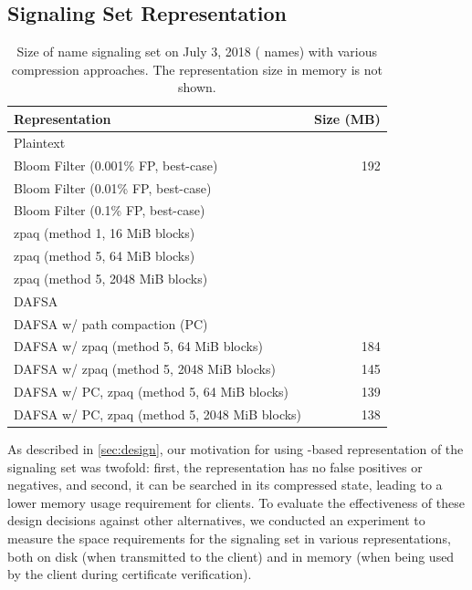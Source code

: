 \subsection{Signaling Set Representation}
\label{sec:evaluation:implementation}



\begin{table}[tb]
  \centering
  \caption{Size of \ac{name} signaling set on
    July 3, 2018 (\numnames{} names) with various compression approaches. The
    representation size in memory is not shown.}
  \begin{tabularx}{\linewidth}{|Xr|}
    \toprule
    \textbf{Representation} & \textbf{Size (MB)} \\
    \midrule
    Plaintext & \plaintextsize \\
    \midrule
    Bloom Filter (0.001\% FP, best-case) & 192 \\
    Bloom Filter (0.01\% FP, best-case) & \bloomlargesize \\
    Bloom Filter (0.1\% FP, best-case) & \bloommedsize \\
    \midrule
    zpaq (method 1, 16 MiB blocks) & \zpaqlargesize \\
    zpaq (method 5, 64 MiB blocks) & \zpaqmedsize \\
    zpaq (method 5, 2048 MiB blocks) & \zpaqsmallsize \\
    \midrule
    DAFSA & \fsalargesize \\
    DAFSA w/ path compaction (PC) & \fsamedsize \\
    DAFSA w/ zpaq (method 5, 64 MiB blocks) & 184 \\
    DAFSA w/ zpaq (method 5, 2048 MiB blocks) & 145 \\
    DAFSA w/ PC, zpaq (method 5, 64 MiB blocks) & 139 \\
    DAFSA w/ PC, zpaq (method 5, 2048 MiB blocks) & 138 \\
    \bottomrule
  \end{tabularx}
  \label{tab:signaling}
\end{table}

As described in \autoref{sec:design}, our motivation for using -based
representation of the signaling set was twofold: first, the representation has
no false positives or negatives, and second, it can be searched in its
compressed state, leading to a lower memory usage requirement for clients. To
evaluate the effectiveness of these design decisions against other alternatives,
we conducted an experiment to measure the space requirements for the signaling
set in various representations, both on disk (when transmitted to the client)
and in memory (when being used by the client during certificate verification).

